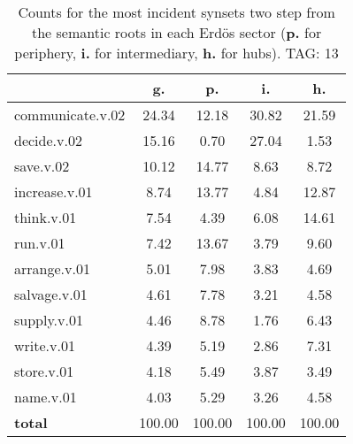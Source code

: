 \begin{table}[h!]
\begin{center}
\begin{tabular}{| l | c | c | c | c |}\hline
 & g. & p. & i. & h. \\\hline
communicate.v.02 & 24.34  & 12.18  & 30.82  & 21.59 \\\hline
decide.v.02 & 15.16  & 0.70  & 27.04  & 1.53 \\\hline
save.v.02 & 10.12  & 14.77  & 8.63  & 8.72 \\\hline
increase.v.01 & 8.74  & 13.77  & 4.84  & 12.87 \\\hline
think.v.01 & 7.54  & 4.39  & 6.08  & 14.61 \\\hline
run.v.01 & 7.42  & 13.67  & 3.79  & 9.60 \\\hline
arrange.v.01 & 5.01  & 7.98  & 3.83  & 4.69 \\\hline
salvage.v.01 & 4.61  & 7.78  & 3.21  & 4.58 \\\hline
supply.v.01 & 4.46  & 8.78  & 1.76  & 6.43 \\\hline
write.v.01 & 4.39  & 5.19  & 2.86  & 7.31 \\\hline
store.v.01 & 4.18  & 5.49  & 3.87  & 3.49 \\\hline
name.v.01 & 4.03  & 5.29  & 3.26  & 4.58 \\\hline
{{\bf total}} & 100.00  & 100.00  & 100.00  & 100.00 \\\hline
\end{tabular}
\caption{Counts for the most incident synsets two step from the semantic roots in each Erd\"os sector ({\bf p.} for periphery, {\bf i.} for intermediary, {\bf h.} for hubs). TAG: 13}
\end{center}
\end{table}